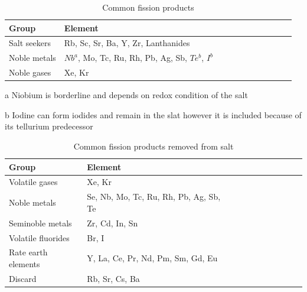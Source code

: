 \begin{table}[p]
   \caption{\label{tab:common_fission_products} Common fission products}
   \centering
   \begin{threeparttable}
   \begin{tabular}{l llllllllll}
   \hline
   \textbf{Group} & \textbf{Element}\\
   \hline 
   Salt seekers & Rb, Sc, Sr, Ba, Y, Zr, Lanthanides \\ [1ex]
   Noble metals & $Nb^{a}$, Mo, Tc, Ru, Rh, Pb, Ag, Sb, $Te^{b}$, $I^{b}$ \\ [1ex]
   Noble gases & Xe, Kr \\ [1ex]
   \hline
   \end{tabular}
   \begin{tablenotes}\footnotesize
   \item[a] Niobium is borderline and depends on redox condition of the salt 
   \item[b] Iodine can form iodides and remain in the slat however it is included because of its tellurium predecessor \cite{grimes1975}
   \end{tablenotes}
   \end{threeparttable}
\end{table}


\vspace{12.7mm} %

\begin{table}[p]
   \caption{\label{tab:common_fission_products_removed} Common fission products removed from salt}
   \centering
   \begin{tabular}{l llllllllll}
   \hline
   \textbf{Group} & \textbf{Element}\\
   \hline 
   Volatile gases & Xe, Kr \\ [1ex]
   Noble metals & Se, Nb, Mo, Tc, Ru, Rh, Pb, Ag, Sb, Te \\ [1ex]
   Seminoble metals & Zr, Cd, In, Sn \\ [1ex]
   Volatile fluorides & Br, I \\ [1ex]
   Rate earth elements & Y, La, Ce, Pr, Nd, Pm, Sm, Gd, Eu \\ [1ex]
   Discard & Rb, Sr, Cs, Ba \\ [1ex]
   \hline
   \end{tabular}
\end{table}

\FloatBarrier

